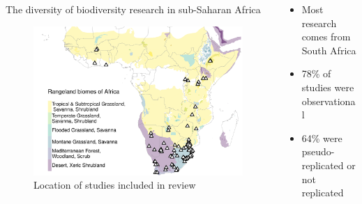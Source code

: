 \documentclass[final]{beamer}\usepackage[]{graphicx}\usepackage[]{color}
\makeatletter
\def\maxwidth{ %
  \ifdim\Gin@nat@width>\linewidth
    \linewidth
  \else
    \Gin@nat@width
  \fi
}
\newenvironment{knitrout}{}{} %
\newlength{\twocolwid}
\makeatother
\begin{document}
\begin{frame}[t]
\begin{columns}[t]
\begin{column}{\twocolwid} %

\begin{columns}[T] %

\begin{column}{0.5\textwidth}
\vspace{-2cm}
\begin{block}{The diversity of biodiversity research in sub-Saharan Africa} \end{block}
\vspace{-1cm}

\begin{knitrout}
\color{fgcolor}\begin{figure}

\includegraphics[width=\maxwidth]{figure/beamer-map-1} \hfill{}

\caption[ Location of studies included in review]{ Location of studies included in review}\label{fig:map}
\end{figure}


\end{knitrout}


\end{column}%
\hfill%
\begin{column}{0.45\textwidth}
\vspace{-2cm}
\begin{itemize}
\item Most research comes from South Africa
\item 78\% of studies were observational
\item 64\% were pseudo-replicated or not replicated
\end{itemize}


\end{column}
\end{columns}
\end{column}
\end{columns}
\end{frame}
\end{document}
